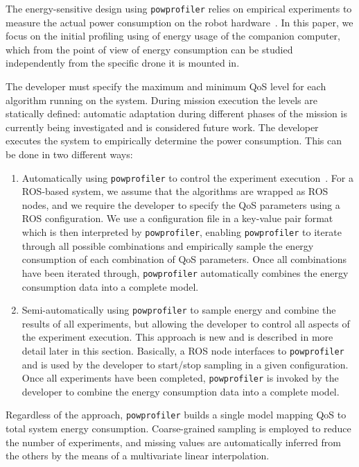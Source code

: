 \documentclass[conference]{IEEEtran}
\newcommand{\stt}[1]{{\small\tt #1}} %
\newcommand{\powprof}{\stt{powprofiler}}
\begin{document}
The energy-sensitive design using \powprof{} relies on empirical
experiments to measure the actual power consumption on the robot
hardware~\cite{seewald2019coarse}.
%
In this paper, we focus on the
initial profiling using of energy usage of the companion computer,
which from the point of view of energy consumption
can be studied independently from the specific drone it is mounted in.

The developer must specify the maximum and minimum QoS level for
each algorithm running on the system.  During mission execution the
levels are statically defined: automatic adaptation during different
phases of the mission is currently being investigated and is
considered future work.
%
The developer executes the system to empirically determine the
power consumption. This can be done in two different ways:
%
\begin{enumerate}
\item Automatically using \powprof{} to control the experiment
  execution~\cite{seewald2019coarse}. For a ROS-based system, we assume that the algorithms
  are wrapped as ROS nodes, and we require the developer to specify
  the QoS parameters using a ROS configuration. We use a configuration
  file in a key-value pair format which is then interpreted by
  \powprof{}, enabling \powprof{} to iterate through all possible
  combinations and empirically sample the energy consumption of each
  combination of QoS parameters. Once all combinations have been
  iterated through, \powprof{} automatically combines the energy
  consumption data into a complete model.
\item Semi-automatically using \powprof{} to sample energy and combine
  the results of all experiments, but allowing the developer to
  control all aspects of the experiment execution. This approach is new and is described in more detail later in this
  section. Basically, a ROS node interfaces to \powprof{} and is used
  by the developer to start/stop sampling in a given
  configuration. Once all experiments have been completed, \powprof{} is
  invoked by the developer to combine the energy consumption data into
  a complete model.

\end{enumerate}
%
Regardless of the approach, \powprof{} builds a single model mapping
QoS to total system energy consumption. Coarse-grained sampling is
employed to reduce the number of experiments, and missing values are
automatically inferred from the others by the means of a multivariate
linear interpolation.
\end{document}
